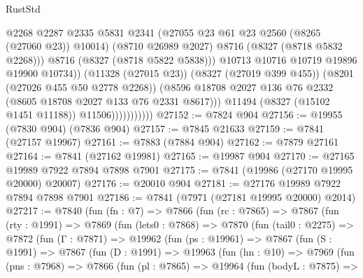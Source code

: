 \begin{lexlean}{RustStd}
\begin{coremodule}
                                    @2268
                                    @2287
                                    @2335
                                    @5831
                                    @2341
                                    (@27055 @23 @61 @23 @2560 (@8265 (@27060 @23)) @10014)
                                    (@8710 @26989 @2027)
                                    @8716
                                    (@8327 (@8718 @5832 @2268)))
                                  @8716
                                  (@8327 (@8718 @5822 @5838)))
                                @10713
                                @10716
                                @10719
                                @19896
                                @19900
                                @10734))
                            (@11328 (@27015 @23))
                            (@8327 (@27019 @399 @455))
                            (@8201 (@27026 @455 @50 @2778 @2268))
                            (@8596
                              @18708
                              @2027
                              @136
                              @76
                              @2332
                              (@8605 @18708 @2027 @133 @76 @2331 @8617)))
                          @11494
                          (@8327 (@15102 @1451 @11188))
                          @11506)))))))))))
@27152 := @7824 @904
@27156 := @19955 (@7830 @904) (@7836 @904)
@27157 := @7845 @21633
@27159 := @7841 (@27157 @19967)
@27161 := @7883 (@7884 @904)
@27162 := @7879 @27161
@27164 := @7841 (@27162 @19981)
@27165 := @19987 @904
@27170 := @27165 @19989 @7922 @7894 @7898 @7901
@27175 := @7841 (@19986 (@27170 @19995 @20000) @20007)
@27176 := @20010 @904
@27181 := @27176 @19989 @7922 @7894 @7898 @7901
@27186 := @7841 (@7971 (@27181 @19995 @20000) @2014)
@27217 := @7840
    (fun (fn : @7) =>
    @7866
      (fun (rc : @7865) =>
      @7867
        (fun (rty : @1991) =>
        @7869
          (fun (lets0 : @7868) =>
          @7870
            (fun (tail0 : @2275) =>
            @7872
              (fun (Γ : @7871) =>
              @19962
                (fun (ps : @19961) =>
                @7867
                  (fun (S : @1991) =>
                  @7867
                    (fun (D : @1991) =>
                    @19963
                      (fun (hn : @10) =>
                      @7969
                        (fun (pns : @7968) =>
                        @7866
                          (fun (pl : @7865) =>
                          @19964
                            (fun (bodyL : @7875) =>

\end{coremodule}
\end{lexlean}
